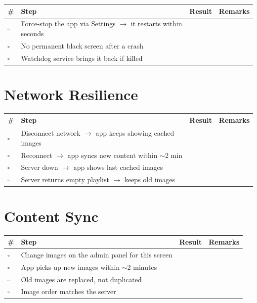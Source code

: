 \documentclass[11pt,a4paper]{article}
\newcommand{\checkbox}{$\square$\;}
\begin{document}
\begin{tabular}{@{}p{0.5cm}p{10cm}p{2cm}p{3cm}@{}}
\toprule
\textbf{\#} & \textbf{Step} & \textbf{Result} & \textbf{Remarks} \\
\midrule
\checkbox & Force-stop the app via Settings $\rightarrow$ it restarts within seconds & & \\[0.3cm]
\checkbox & No permanent black screen after a crash & & \\[0.3cm]
\checkbox & Watchdog service brings it back if killed & & \\
\bottomrule
\end{tabular}

\section{Network Resilience}

\begin{tabular}{@{}p{0.5cm}p{10cm}p{2cm}p{3cm}@{}}
\toprule
\textbf{\#} & \textbf{Step} & \textbf{Result} & \textbf{Remarks} \\
\midrule
\checkbox & Disconnect network $\rightarrow$ app keeps showing cached images & & \\[0.3cm]
\checkbox & Reconnect $\rightarrow$ app syncs new content within $\sim$2 min & & \\[0.3cm]
\checkbox & Server down $\rightarrow$ app shows last cached images & & \\[0.3cm]
\checkbox & Server returns empty playlist $\rightarrow$ keeps old images & & \\
\bottomrule
\end{tabular}

\section{Content Sync}

\begin{tabular}{@{}p{0.5cm}p{10cm}p{2cm}p{3cm}@{}}
\toprule
\textbf{\#} & \textbf{Step} & \textbf{Result} & \textbf{Remarks} \\
\midrule
\checkbox & Change images on the admin panel for this screen & & \\[0.3cm]
\checkbox & App picks up new images within $\sim$2 minutes & & \\[0.3cm]
\checkbox & Old images are replaced, not duplicated & & \\[0.3cm]
\checkbox & Image order matches the server & & \\
\bottomrule
\end{tabular}
\end{document}
